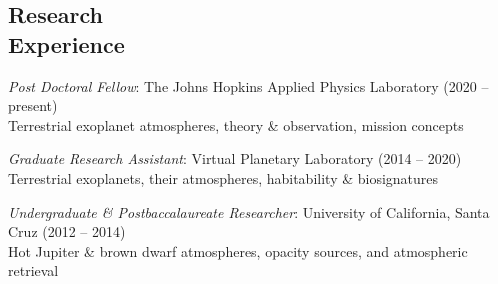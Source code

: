 \documentclass[margin,10pt]{res}
\begin{document}
\begin{resume}
\section{Research \\Experience} 
                {\sl Post Doctoral Fellow}: The Johns Hopkins Applied Physics Laboratory \hfill (2020 -- present)\\
                Terrestrial exoplanet atmospheres, theory \& observation, mission concepts
                
                {\sl Graduate Research Assistant}: Virtual Planetary Laboratory   \hfill (2014 -- 2020)\\
                Terrestrial exoplanets, their atmospheres, habitability \& biosignatures

                {\sl Undergraduate \& Postbaccalaureate Researcher}: University of California, Santa Cruz \hfill          (2012 -- 2014)\\
                Hot Jupiter \& brown dwarf atmospheres, opacity sources, and atmospheric retrieval \\
                                  

\end{resume}
\end{document}
